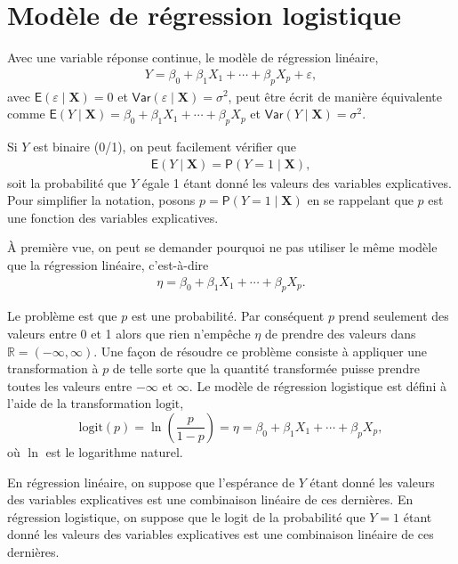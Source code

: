 \documentclass[
  11pt,
  letterpaper,
]{book}
\theoremstyle{definition}
\theoremstyle{definition}
\theoremstyle{definition}
\theoremstyle{remark}
\begin{document}
\hypertarget{moduxe8le-de-ruxe9gression-logistique}{%
\section{Modèle de régression logistique}\label{moduxe8le-de-ruxe9gression-logistique}}

Avec une variable réponse continue, le modèle de régression linéaire,
\begin{align*}
 Y = \beta_0 + \beta_1X_1 + \cdots + \beta_p X_p + \varepsilon,
\end{align*}
avec \({\mathsf E}\left(\varepsilon\mid \boldsymbol{X}\right)=0\) et \({\mathsf{Var}}\left(\varepsilon\mid \boldsymbol{X}\right)=\sigma^2\), peut être écrit de manière équivalente comme \({\mathsf E}\left(Y \mid \boldsymbol{X}\right) = \beta_0 + \beta_1X_1 + \cdots + \beta_pX_p\) et \({\mathsf{Var}}\left(Y \mid \boldsymbol{X}\right)=\sigma^2.\)

Si \(Y\) est binaire (0/1), on peut facilement vérifier que
\begin{align*}
{\mathsf E}\left(Y \mid \boldsymbol{X}\right) = {\mathsf P}\left(Y=1 \mid  \boldsymbol{X}\right),
\end{align*}
soit la probabilité que \(Y\) égale 1 étant donné les valeurs des variables explicatives. Pour simplifier la notation, posons \(p = {\mathsf P}\left(Y=1 \mid \boldsymbol{X}\right)\) en se rappelant que \(p\) est une fonction des variables explicatives.

À première vue, on peut se demander pourquoi ne pas utiliser le même modèle que la régression linéaire, c'est-à-dire
\begin{align*}
\eta=\beta_0 + \beta_1X_1 + \cdots + \beta_p X_p.
\end{align*}

Le problème est que \(p\) est une probabilité. Par conséquent \(p\) prend seulement des valeurs entre 0 et 1 alors que rien n'empêche \(\eta\) de prendre des valeurs dans \(\mathbb{R}=(-\infty, \infty)\). Une façon de résoudre ce problème consiste à appliquer une transformation à \(p\) de telle sorte que la quantité transformée puisse prendre toutes les valeurs entre \(-\infty\) et \(\infty\).
Le modèle de régression logistique est défini à l'aide de la transformation \(\mathrm{logit}\),
\[\mathrm{logit}(p) = \ln\left( \frac{p}{1-p}\right)=\eta=\beta_0 + \beta_1X_1 + \cdots + \beta_p X_p,\]
où \(\ln\) est le logarithme naturel.

En régression linéaire, on suppose que l'espérance de \(Y\) étant donné les valeurs des variables explicatives est une combinaison linéaire de ces dernières. En régression logistique, on suppose que le logit de la probabilité que \(Y=1\) étant donné les valeurs des variables explicatives est une combinaison linéaire de ces dernières.
\end{document}
